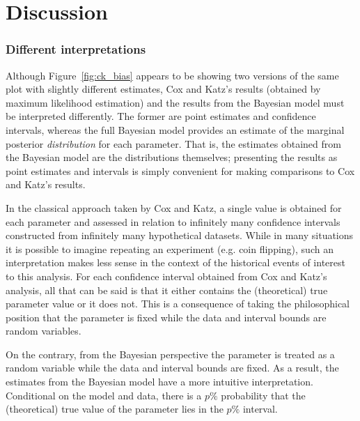 \section{Discussion}
\label{ck_discussion}

\subsubsection{Different interpretations}

Although Figure~\ref{fig:ck_bias} appears to be showing two versions of the same plot with
slightly different estimates, Cox and Katz's results (obtained by maximum likelihood estimation) 
and the results from the Bayesian model must be interpreted differently. The former are point estimates 
and confidence intervals, whereas the full Bayesian model provides an estimate of the marginal posterior 
{\it distribution} for each parameter. That is, the estimates obtained from the Bayesian model are the 
distributions themselves; presenting the results as point estimates and intervals is simply convenient for 
making comparisons to Cox and Katz's results. 

In the classical approach taken by Cox and Katz, a single value is obtained for each parameter and 
assessed in relation to infinitely many confidence intervals constructed from infinitely many hypothetical 
datasets. While in many situations it is possible to imagine repeating an experiment (e.g. coin flipping), 
such an interpretation makes less sense in the context of the historical events of interest to this analysis. 
For each confidence interval obtained from Cox and Katz's analysis, all that can be said is that it either 
contains the (theoretical) true parameter value or it does not. This is a consequence of taking the 
philosophical position that the parameter is fixed while the data and interval bounds are 
random variables. 

On the contrary, from the Bayesian perspective the parameter is treated as a random variable while 
the data and interval bounds are fixed. As a result, the estimates from the  Bayesian model have a 
more intuitive interpretation. Conditional on the model and data, there is a $p\%$ probability that the 
(theoretical) true value of the parameter lies in the $p\%$ interval. 
